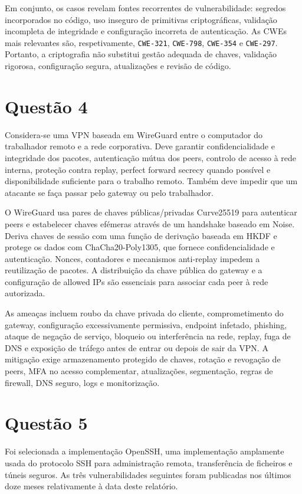 \documentclass[11pt,a4paper]{article}
\begin{document}
Em conjunto, os casos revelam fontes recorrentes de vulnerabilidade: segredos incorporados no código, uso inseguro de primitivas criptográficas, validação incompleta de integridade e configuração incorreta de autenticação. As CWEs mais relevantes são, respetivamente, \texttt{CWE-321}, \texttt{CWE-798}, \texttt{CWE-354} e \texttt{CWE-297}. Portanto, a criptografia não substitui gestão adequada de chaves, validação rigorosa, configuração segura, atualizações e revisão de código.

\section*{Questão 4}

Considera-se uma VPN baseada em WireGuard entre o computador do trabalhador remoto e a rede corporativa. Deve garantir confidencialidade e integridade dos pacotes, autenticação mútua dos peers, controlo de acesso à rede interna, proteção contra replay, perfect forward secrecy quando possível e disponibilidade suficiente para o trabalho remoto. Também deve impedir que um atacante se faça passar pelo gateway ou pelo trabalhador.

O WireGuard usa pares de chaves públicas/privadas Curve25519 para autenticar peers e estabelecer chaves efémeras através de um handshake baseado em Noise. Deriva chaves de sessão com uma função de derivação baseada em HKDF e protege os dados com ChaCha20-Poly1305, que fornece confidencialidade e autenticação. Nonces, contadores e mecanismos anti-replay impedem a reutilização de pacotes. A distribuição da chave pública do gateway e a configuração de allowed IPs são essenciais para associar cada peer à rede autorizada.

As ameaças incluem roubo da chave privada do cliente, comprometimento do gateway, configuração excessivamente permissiva, endpoint infetado, phishing, ataque de negação de serviço, bloqueio ou interferência na rede, replay, fuga de DNS e exposição de tráfego antes de entrar ou depois de sair da VPN. A mitigação exige armazenamento protegido de chaves, rotação e revogação de peers, MFA no acesso complementar, atualizações, segmentação, regras de firewall, DNS seguro, logs e monitorização.

\section*{Questão 5}

Foi selecionada a implementação OpenSSH, uma implementação amplamente usada do protocolo SSH para administração remota, transferência de ficheiros e túneis seguros. As três vulnerabilidades seguintes foram publicadas nos últimos doze meses relativamente à data deste relatório.
\end{document}
